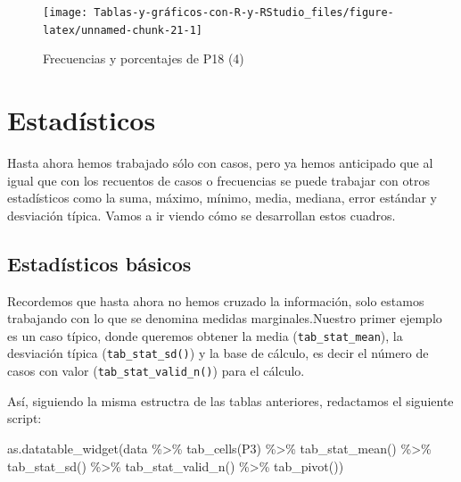 \documentclass[
]{book}
\newenvironment{Shaded}{\begin{snugshade}}{\end{snugshade}}
\newcommand{\FunctionTok}[1]{\textcolor[rgb]{0.00,0.00,0.00}{#1}}
\newcommand{\NormalTok}[1]{#1}
\newcommand{\SpecialCharTok}[1]{\textcolor[rgb]{0.00,0.00,0.00}{#1}}
\begin{document}
\begin{figure}[H]

{\centering \texttt{[image: Tablas-y-gráficos-con-R-y-RStudio\_files/figure-latex/unnamed-chunk-21-1]} 

}

\caption{Frecuencias y porcentajes de P18 (4)}\label{fig:unnamed-chunk-21}
\end{figure}

\hypertarget{estaduxedsticos}{%
\section{Estadísticos}\label{estaduxedsticos}}

Hasta ahora hemos trabajado sólo con casos, pero ya hemos anticipado que al igual que con los recuentos de casos o frecuencias se puede trabajar con otros estadísticos como la suma, máximo, mínimo, media, mediana, error estándar y desviación típica. Vamos a ir viendo cómo se desarrollan estos cuadros.

\hypertarget{estaduxedsticos-buxe1sicos}{%
\subsection{Estadísticos básicos}\label{estaduxedsticos-buxe1sicos}}

Recordemos que hasta ahora no hemos cruzado la información, solo estamos trabajando con lo que se denomina medidas marginales.Nuestro primer ejemplo es un caso típico, donde queremos obtener la media (\texttt{tab\_stat\_mean}), la desviación típica (\texttt{tab\_stat\_sd()}) y la base de cálculo, es decir el número de casos con valor (\texttt{tab\_stat\_valid\_n()}) para el cálculo.

Así, siguiendo la misma estructra de las tablas anteriores, redactamos el siguiente script:

\begin{Shaded}
\begin{Highlighting}[]
\FunctionTok{as.datatable\_widget}\NormalTok{(data }\SpecialCharTok{\%\textgreater{}\%} \FunctionTok{tab\_cells}\NormalTok{(P3) }\SpecialCharTok{\%\textgreater{}\%} \FunctionTok{tab\_stat\_mean}\NormalTok{() }\SpecialCharTok{\%\textgreater{}\%} 
  \FunctionTok{tab\_stat\_sd}\NormalTok{() }\SpecialCharTok{\%\textgreater{}\%} \FunctionTok{tab\_stat\_valid\_n}\NormalTok{() }\SpecialCharTok{\%\textgreater{}\%} \FunctionTok{tab\_pivot}\NormalTok{())}
\end{Highlighting}
\end{Shaded}
\end{document}
